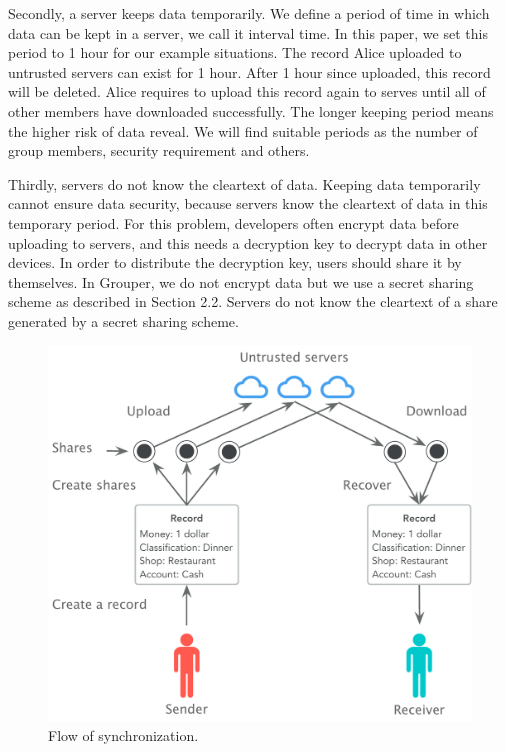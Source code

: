 \documentclass[twocolumn,10pt]{article}
\begin{document}
Secondly, a server keeps data temporarily. We define a period of time in which data can be kept in a server, we call it interval time. In this paper, we set this period to 1 hour for our example situations. The record Alice uploaded to untrusted servers can exist for 1 hour. After 1 hour since uploaded, this record will be deleted. Alice requires to upload this record again to serves until all of other members have downloaded successfully. The longer keeping period means the higher risk of data reveal. We will find suitable periods as the number of group members, security requirement and others. 

Thirdly, servers do not know the cleartext of data. Keeping data temporarily cannot ensure data security, because servers know the cleartext of data in this temporary period. For this problem, developers often encrypt data before uploading to servers, and this needs a decryption key to decrypt data in other devices. In order to distribute the decryption key, users should share it by themselves. In Grouper, we do not encrypt data but we use a secret sharing scheme as described in Section 2.2. Servers do not know the cleartext of a share generated by a secret sharing scheme.

\begin{figure}[t]
	\centering
	\includegraphics[scale=0.38]{sync_flow}
	\caption{Flow of synchronization.}
\end{figure}
\end{document}
